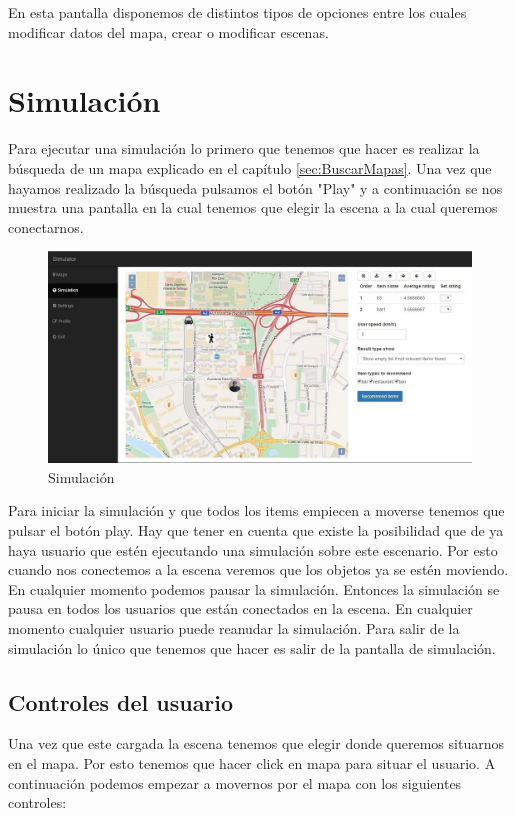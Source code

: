 En esta pantalla disponemos de distintos tipos de opciones entre los cuales modificar datos del mapa, crear o modificar escenas.

\section{Simulación}

Para ejecutar una simulación lo primero que tenemos que hacer es realizar la búsqueda de un mapa explicado en el capítulo \ref{sec:BuscarMapas}. Una vez que hayamos realizado la búsqueda pulsamos el botón "Play" y a continuación se nos muestra una pantalla en la cual tenemos que elegir la escena a la cual queremos conectarnos.

\begin{figure}[H]
	\centering\includegraphics[scale=0.25]{imagenes/capitulo11/capitulo11.jpg}
	\caption{Simulación}
	\label{img:Simulation}
\end{figure}

Para iniciar la simulación y que todos los items empiecen a moverse tenemos que pulsar el botón play. Hay que tener en cuenta que existe la posibilidad que de ya haya usuario que estén ejecutando una simulación sobre este escenario. Por esto cuando nos conectemos a la escena veremos que los objetos ya se estén moviendo. En cualquier momento podemos pausar la simulación. Entonces la simulación se pausa en todos los usuarios que están conectados en la escena. En cualquier momento cualquier usuario puede reanudar la simulación. Para salir de la simulación lo único que tenemos que hacer es salir de la pantalla de simulación.

\subsection{Controles del usuario}

Una vez que este cargada la escena tenemos que elegir donde queremos situarnos en el mapa. Por esto tenemos que hacer click en mapa para situar el usuario. A continuación podemos empezar a movernos por el mapa con los siguientes controles:

